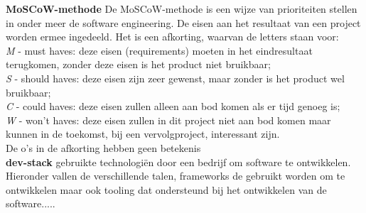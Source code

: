 \textbf{MoSCoW-methode}
De MoSCoW-methode is een wijze van prioriteiten stellen in onder meer de software engineering. De eisen aan het resultaat van een project worden ermee ingedeeld. Het is een afkorting, waarvan de letters staan voor:\\
\textit{M} - must haves: deze eisen (requirements) moeten in het eindresultaat terugkomen, zonder deze eisen is het product niet bruikbaar;\\
\textit{S} - should haves: deze eisen zijn zeer gewenst, maar zonder is het product wel bruikbaar;\\
\textit{C} - could haves: deze eisen zullen alleen aan bod komen als er tijd genoeg is;\\
\textit{W} - won't haves: deze eisen zullen in dit project niet aan bod komen maar kunnen in de toekomst, bij een vervolgproject, interessant zijn.\\
De o's in de afkorting hebben geen betekenis\\

\textbf{dev-stack}
gebruikte technologi\"en door een bedrijf om software te ontwikkelen. Hieronder vallen de verschillende talen, frameworks de gebruikt worden om te ontwikkelen maar ook tooling dat ondersteund bij het ontwikkelen van de software.....
